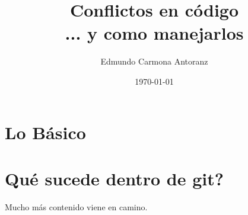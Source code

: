 \documentclass{report}
\title{Conflictos en código \\
	\large ... y como manejarlos}
\author{Edmundo Carmona Antoranz}
\date{\today}
\begin{document}
\begin{titlepage}
\maketitle
\end{titlepage}


\clearpage


\clearpage


\clearpage


\clearpage


\clearpage


\clearpage

\chapter{Lo Básico}

\clearpage


\clearpage


\clearpage


\clearpage


\clearpage


\clearpage


\clearpage


\chapter{Qué sucede dentro de git?}

\clearpage

Mucho más contenido viene en camino.


\end{document}
